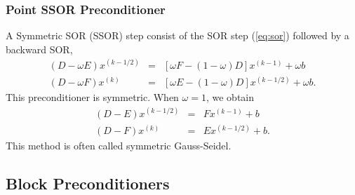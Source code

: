 \subsubsection{Point SSOR Preconditioner}
\label{sec:ssor}

A Symmetric SOR (SSOR) step consist of the SOR step (\ref{eq:sor}) followed by
a backward SOR,
\begin{equation}
\label{eq:ssor}
\begin{array}{rcl}
(D - \omega E) x^{(k-1/2)} &= &[ \omega F - (1 - \omega)D] x^{(k-1)} + \omega b \\
(D - \omega F) x^{(k)} &=& [ \omega E - (1 - \omega)D] x^{(k-1/2)} + \omega b .
\end{array}
\end{equation}
This preconditioner is symmetric. When $\omega = 1$, we obtain
\begin{equation}
\label{eq:sgs}
\begin{array}{rcl}
(D - E) x^{(k-1/2)} &= & F x^{(k-1)} + b \\
(D - F) x^{(k)}     &= & E  x^{(k-1/2)} + b .
\end{array}
\end{equation}
This method
is often called symmetric Gauss-Seidel.

\subsection{Block Preconditioners}
\label{sec:block}

